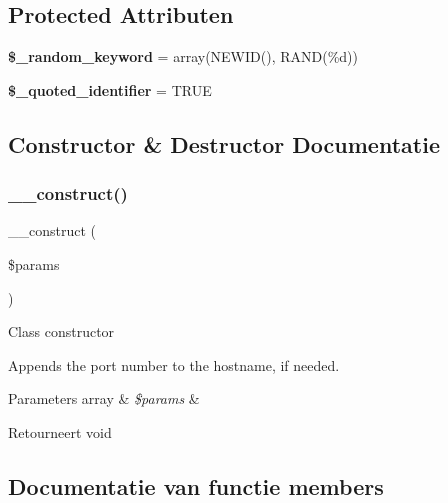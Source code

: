 \subsection*{Protected Attributen}
\begin{DoxyCompactItemize}
\item 
\mbox{\label{class_c_i___d_b__mssql__driver_a10213aa6e05f6d924d3277bb1d2fea00}} 
{\bfseries \$\+\_\+random\+\_\+keyword} = array(\textquotesingle{}N\+E\+W\+ID()\textquotesingle{}, \textquotesingle{}R\+A\+ND(\%d)\textquotesingle{})
\item 
\mbox{\label{class_c_i___d_b__mssql__driver_a1dae2f0e9ad7299438a9976d6cdbf2ad}} 
{\bfseries \$\+\_\+quoted\+\_\+identifier} = T\+R\+UE
\end{DoxyCompactItemize}


\subsection{Constructor \& Destructor Documentatie}
\mbox{\label{class_c_i___d_b__mssql__driver_a9162320adff1a1a4afd7f2372f753a3e}} 
\subsubsection{\texorpdfstring{\_\_construct()}{\_\_construct()}}
{\footnotesize\ttfamily \+\_\+\+\_\+construct (\begin{DoxyParamCaption}\item[{}]{\$params }\end{DoxyParamCaption})}

Class constructor

Appends the port number to the hostname, if needed.


\begin{DoxyParams}[1]{Parameters}
array & {\em \$params} & \\
\hline
\end{DoxyParams}
\begin{DoxyReturn}{Retourneert}
void 
\end{DoxyReturn}


\subsection{Documentatie van functie members}
\mbox{\label{class_c_i___d_b__mssql__driver_a4d9082658000e5ede8312067c6dda9db}} 
